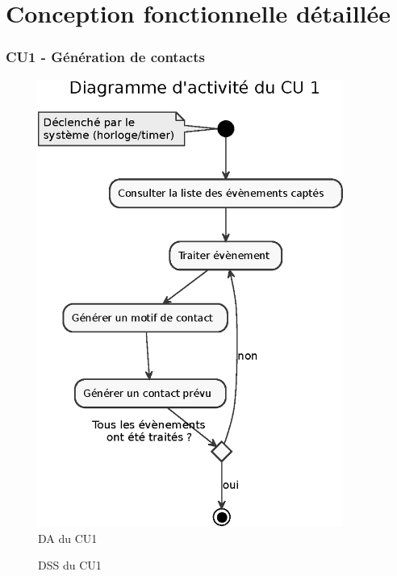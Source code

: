 \part{Conception fonctionnelle détaillée}
\setcounter{section}{0}

\section{CU1 - Génération de contacts}
\begin{figure}[H]
\centering
\includegraphics[width=10cm]{figures/eps/DA_CU1.eps}
\caption{DA du CU1}
\end{figure}

\begin{figure}[H]
\noindent{}
\caption{DSS du CU1}
\end{figure}


